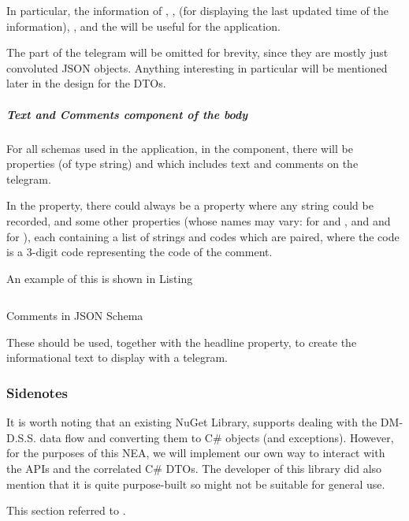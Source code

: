 In particular, the information of , ,  (for displaying the last updated time of the information), ,  and the  will be useful for the application.

The  part of the telegram will be omitted for brevity, since they are mostly just convoluted JSON objects. Anything interesting in particular will be mentioned later in the design for the DTOs.

\subparagraph{Text and Comments component of the body} For all schemas used in the application, in the  component, there will be properties  (of type string) and  which includes text and comments on the telegram.

In the  property, there could always be a  property where any string could be recorded, and some other properties (whose names may vary:  for  and , and  and  for ), each containing a list of strings and codes which are paired, where the code is a 3-digit code representing the code of the comment.

An example of this is shown in Listing

\begin{listing}[htp]
    \inputminted{json}{code/TelegramComments.json}
    \caption{Comments in JSON Schema}
    \label{code:telegram-comments}
\end{listing}

These should be used, together with the headline property, to create the informational text to display with a telegram.

\subsubsection{Sidenotes}

It is worth noting that an existing NuGet Library,  supports dealing with the DM-D.S.S. data flow and converting them to C\# objects (and exceptions). However, for the purposes of this NEA, we will implement our own way to interact with the APIs and the correlated C\# DTOs. The developer of this library did also mention that it is quite purpose-built so might not be suitable for general use.

This section referred to \autocite{dmdata-references-api, dmdata-references-json, dmdata-references-oauth, dmdata-references-telegram}.

